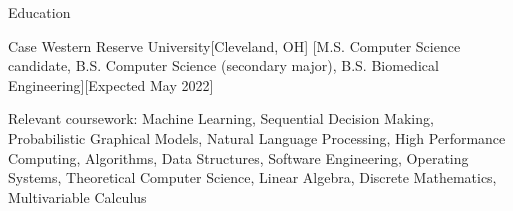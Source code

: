 \begin{rsection}{Education}
\begin{ritemize}
{Case Western Reserve University}[Cleveland, OH]
[M.S. Computer Science candidate, B.S. Computer Science (secondary major), B.S. Biomedical Engineering][Expected May 2022]
	\item Relevant coursework: Machine Learning, Sequential Decision Making, Probabilistic Graphical Models, Natural Language Processing, High Performance Computing, Algorithms, Data Structures, Software Engineering, Operating Systems, Theoretical Computer Science, Linear Algebra, Discrete Mathematics, Multivariable Calculus
\end{ritemize}
\end{rsection}